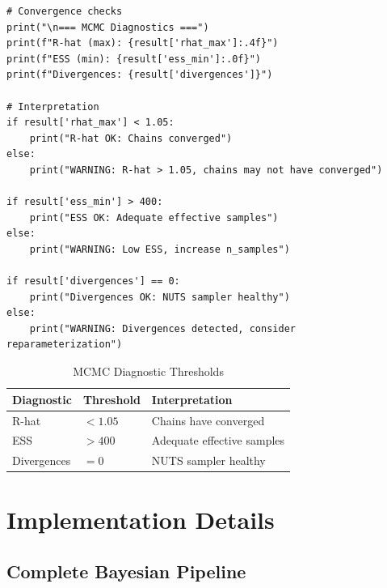 \begin{verbatim}
# Convergence checks
print("\n=== MCMC Diagnostics ===")
print(f"R-hat (max): {result['rhat_max']:.4f}")
print(f"ESS (min): {result['ess_min']:.0f}")
print(f"Divergences: {result['divergences']}")

# Interpretation
if result['rhat_max'] < 1.05:
    print("R-hat OK: Chains converged")
else:
    print("WARNING: R-hat > 1.05, chains may not have converged")

if result['ess_min'] > 400:
    print("ESS OK: Adequate effective samples")
else:
    print("WARNING: Low ESS, increase n_samples")

if result['divergences'] == 0:
    print("Divergences OK: NUTS sampler healthy")
else:
    print("WARNING: Divergences detected, consider reparameterization")
\end{verbatim}

\begin{table}[h]
\centering
\caption{MCMC Diagnostic Thresholds}
\begin{tabular}{lll}
\toprule
Diagnostic & Threshold & Interpretation \\
\midrule
R-hat & $< 1.05$ & Chains have converged \\
ESS & $> 400$ & Adequate effective samples \\
Divergences & $= 0$ & NUTS sampler healthy \\
\bottomrule
\end{tabular}
\end{table}


\section{Implementation Details}

\subsection{Complete Bayesian Pipeline}

